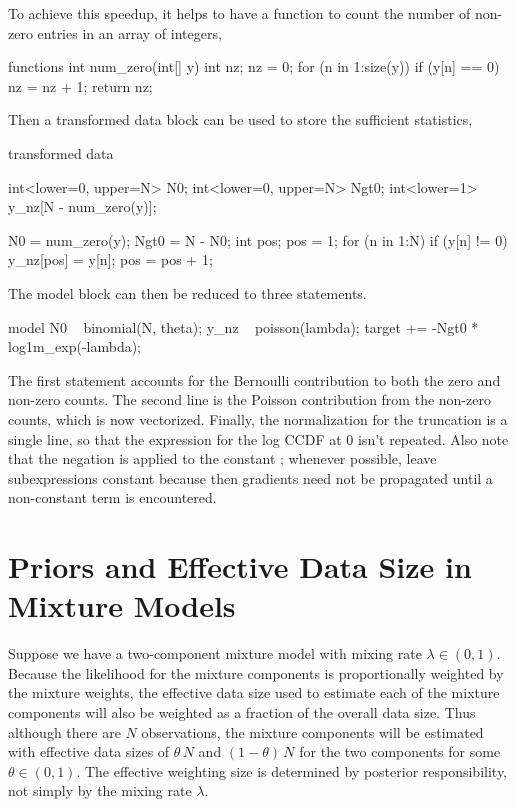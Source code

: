 To achieve this speedup, it helps to have a function to count the
number of non-zero entries in an array of integers,
%
\begin{stancode}
functions {
  int num_zero(int[] y) {
    int nz;
    nz = 0;
    for (n in 1:size(y))
      if (y[n] == 0)
        nz = nz + 1;
    return nz;
  }
}
\end{stancode}
%
Then a transformed data block can be used to store the sufficient
statistics,
%
\begin{stancode}
transformed data {
  int<lower=0, upper=N> N0;
  int<lower=0, upper=N> Ngt0;
  int<lower=1> y_nz[N - num_zero(y)];

  N0 = num_zero(y);
  Ngt0 = N - N0;
  { 
    int pos;
    pos = 1;
    for (n in 1:N) {
      if (y[n] != 0) {
        y_nz[pos] = y[n];
        pos = pos + 1;
      }
    }
  }
}
\end{stancode}
%
The model block can then be reduced to three statements.
%
\begin{stancode}
model {
  N0 ~ binomial(N, theta);
  y_nz ~ poisson(lambda);
  target += -Ngt0 * log1m_exp(-lambda);
}
\end{stancode}
%
The first statement accounts for the Bernoulli contribution to both
the zero and non-zero counts.  The second line is the Poisson
contribution from the non-zero counts, which is now vectorized.
Finally, the normalization for the truncation is a single line, so
that the expression for the log CCDF at 0 isn't repeated.  Also note
that the negation is applied to the constant ; whenever
possible, leave subexpressions constant because then gradients need
not be propagated until a non-constant term is encountered.


\section{Priors and Effective Data Size in Mixture Models}

Suppose we have a two-component mixture model with mixing rate
$\lambda \in (0, 1)$.  Because the likelihood for the mixture
components is proportionally weighted by the mixture weights, the
effective data size used to estimate each of the mixture components
will also be weighted as a fraction of the overall data size.  Thus
although there are $N$ observations, the mixture components will be
estimated with effective data sizes of $\theta \, N$ and $(1 - \theta)
\, N$ for the two components for some $\theta \in (0, 1)$.  The
effective weighting size is determined by posterior responsibility,
not simply by the mixing rate $\lambda$.

